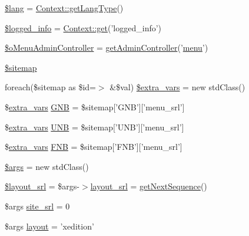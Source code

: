 \begin{DoxyCompactItemize}
\item 
\hyperlink{ko_8install_8php_a7714b111b644017933931ec69a154102}{\$lang} = \hyperlink{classContext_ae75d6f4064d09e48d0d76614b6997e29}{Context\-::get\-Lang\-Type}()
\item 
\hyperlink{ko_8install_8php_a193c1593ceb216e9fb05b0bad01ebbc8}{\$logged\-\_\-info} = \hyperlink{classContext_a90ce25d65fe6c9778421cbb36ab3def5}{Context\-::get}('logged\-\_\-info')
\item 
\hyperlink{ko_8install_8php_a9062530c3b03479ca4530daee1c18887}{\$o\-Menu\-Admin\-Controller} = \hyperlink{func_8inc_8php_a2f7ca88a5226536aca3b2f5682bd7b2d}{get\-Admin\-Controller}('\hyperlink{classmenu}{menu}')
\item 
\hyperlink{ko_8install_8php_ae7b8fee391a6d8b9162de5b69b9dc07f}{\$sitemap}
\item 
foreach(\$sitemap as \$id=$>$ \&\$val) \hyperlink{ko_8install_8php_a99863a9d4b597491e1a9c801f2e55c0b}{\$extra\-\_\-vars} = new std\-Class()
\item 
\$\hyperlink{ko_8install_8php_ae1dcb37fc34a8f312d2e6abd6f806743}{extra\-\_\-vars} \hyperlink{ko_8install_8php_a9b1716b68fc04f3492448f38148dcbf5}{G\-N\-B} = \$sitemap\mbox{[}'G\-N\-B'\mbox{]}\mbox{[}'menu\-\_\-srl'\mbox{]}
\item 
\$\hyperlink{ko_8install_8php_ae1dcb37fc34a8f312d2e6abd6f806743}{extra\-\_\-vars} \hyperlink{ko_8install_8php_abc0cb1f57d83d4a106f4495c30e0df52}{U\-N\-B} = \$sitemap\mbox{[}'U\-N\-B'\mbox{]}\mbox{[}'menu\-\_\-srl'\mbox{]}
\item 
\$\hyperlink{ko_8install_8php_ae1dcb37fc34a8f312d2e6abd6f806743}{extra\-\_\-vars} \hyperlink{ko_8install_8php_a683e060c22be3e658be6f9751a2082f0}{F\-N\-B} = \$sitemap\mbox{[}'F\-N\-B'\mbox{]}\mbox{[}'menu\-\_\-srl'\mbox{]}
\item 
\hyperlink{ko_8install_8php_a67e94494731d99ed23b123e95175bc10}{\$args} = new std\-Class()
\item 
\hyperlink{ko_8install_8php_a77889723c4aa360089caae223118d413}{\$layout\-\_\-srl} = \$args-\/$>$\hyperlink{ko_8install_8php_a70054876db09b2519a1726663c8dd9e7}{layout\-\_\-srl} = \hyperlink{func_8inc_8php_a5a97b458f9c5b4fe3574671840aee27c}{get\-Next\-Sequence}()
\item 
\$args \hyperlink{ko_8install_8php_a8b1406b4ad1048041558dce6bfe89004}{site\-\_\-srl} = 0
\item 
\$args \hyperlink{ko_8install_8php_a0dc2cdff7167f362443808ff71ae5177}{layout} = 'xedition'
\item 

\end{DoxyCompactItemize}
